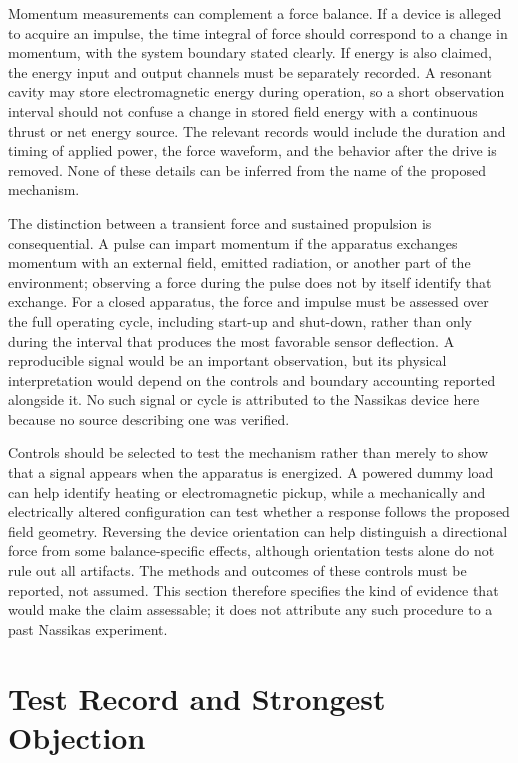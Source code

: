 \documentclass[11pt]{article}
\begin{document}
Momentum measurements can complement a force balance. If a device is alleged to acquire an impulse, the time integral of force should correspond to a change in momentum, with the system boundary stated clearly. If energy is also claimed, the energy input and output channels must be separately recorded. A resonant cavity may store electromagnetic energy during operation, so a short observation interval should not confuse a change in stored field energy with a continuous thrust or net energy source. The relevant records would include the duration and timing of applied power, the force waveform, and the behavior after the drive is removed. None of these details can be inferred from the name of the proposed mechanism.

The distinction between a transient force and sustained propulsion is consequential. A pulse can impart momentum if the apparatus exchanges momentum with an external field, emitted radiation, or another part of the environment; observing a force during the pulse does not by itself identify that exchange. For a closed apparatus, the force and impulse must be assessed over the full operating cycle, including start-up and shut-down, rather than only during the interval that produces the most favorable sensor deflection. A reproducible signal would be an important observation, but its physical interpretation would depend on the controls and boundary accounting reported alongside it. No such signal or cycle is attributed to the Nassikas device here because no source describing one was verified.

Controls should be selected to test the mechanism rather than merely to show that a signal appears when the apparatus is energized. A powered dummy load can help identify heating or electromagnetic pickup, while a mechanically and electrically altered configuration can test whether a response follows the proposed field geometry. Reversing the device orientation can help distinguish a directional force from some balance-specific effects, although orientation tests alone do not rule out all artifacts. The methods and outcomes of these controls must be reported, not assumed. This section therefore specifies the kind of evidence that would make the claim assessable; it does not attribute any such procedure to a past Nassikas experiment.

\section{Test Record and Strongest Objection}
\end{document}
